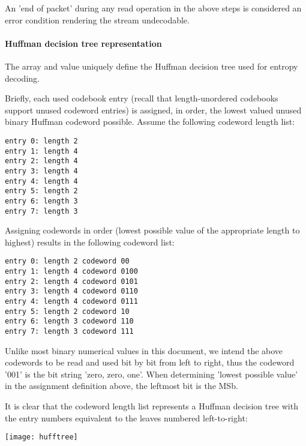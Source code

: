 An 'end of packet' during any read operation in the above steps is
considered an error condition rendering the stream undecodable.

\paragraph{Huffman decision tree representation}

The  array and
 value uniquely define the Huffman decision
tree used for entropy decoding.

Briefly, each used codebook entry (recall that length-unordered
codebooks support unused codeword entries) is assigned, in order, the
lowest valued unused binary Huffman codeword possible.  Assume the
following codeword length list:

\begin{Verbatim}[commandchars=\\\{\}]
entry 0: length 2
entry 1: length 4
entry 2: length 4
entry 3: length 4
entry 4: length 4
entry 5: length 2
entry 6: length 3
entry 7: length 3
\end{Verbatim}

Assigning codewords in order (lowest possible value of the appropriate
length to highest) results in the following codeword list:

\begin{Verbatim}[commandchars=\\\{\}]
entry 0: length 2 codeword 00
entry 1: length 4 codeword 0100
entry 2: length 4 codeword 0101
entry 3: length 4 codeword 0110
entry 4: length 4 codeword 0111
entry 5: length 2 codeword 10
entry 6: length 3 codeword 110
entry 7: length 3 codeword 111
\end{Verbatim}


\begin{note}
Unlike most binary numerical values in this document, we
intend the above codewords to be read and used bit by bit from left to
right, thus the codeword '001' is the bit string 'zero, zero, one'.
When determining 'lowest possible value' in the assignment definition
above, the leftmost bit is the MSb.
\end{note}

It is clear that the codeword length list represents a Huffman
decision tree with the entry numbers equivalent to the leaves numbered
left-to-right:

\begin{center}
\texttt{[image: hufftree]}
\end{center}


